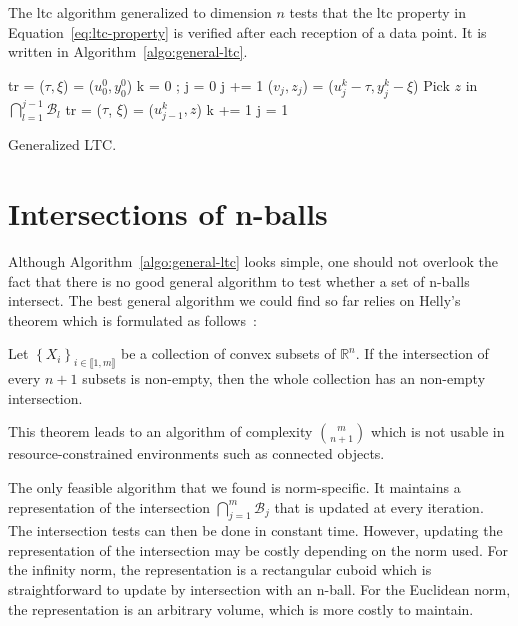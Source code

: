 The \acrshort{ltc} algorithm generalized to dimension $n$ tests that the
\acrshort{ltc} property in Equation~\ref{eq:ltc-property} is verified after each
reception of a data point. It is written in Algorithm~\ref{algo:general-ltc}.
\begin{algorithm}
\begin{algorithmic}[1]
\Input
\EndInput
\Output
\EndOutput

\State tr = ($\tau, \xi$) = ($u^0_0, y^0_0$) 
\State k = 0 ; j = 0
    \State j += 1
    \State ($v_j, z_j$) = ($u_j^k - \tau, y_j^k - \xi$)
        \State Pick $z$ in $\bigcap_{l=1}^{j-1}{\mathcal{B}_l}$ 
        \State tr = ($\tau$, $\xi$) = ($u^k_{j-1}, z$)
        \State k += 1
        \State j = 1
    \EndIf
\EndWhile
\end{algorithmic}
\caption{Generalized LTC.}
\label{algo:general-ltc}
\end{algorithm}

\section{Intersections of n-balls}

Although Algorithm~\ref{algo:general-ltc} looks simple, one should not overlook
the fact that there is no good general algorithm to test whether a set of
n-balls intersect. The best general algorithm we could find so far relies on
Helly's theorem which is formulated as follows~\cite{helly1923mengen}:
\begin{theorem}
Let $\left\{ X_i \right\}_{i \in \llbracket 1, m \rrbracket}$ be a collection of
convex subsets of $\mathbb{R}^n$. If the intersection of every $n+1$ subsets is
non-empty, then the whole collection has an non-empty intersection.
\end{theorem}
\noindent This theorem leads to an algorithm of complexity ${\binom{m}{n+1}}$
which is not usable in resource-constrained environments such as connected
objects.

The only feasible algorithm that we found is norm-specific. It
maintains a representation of the intersection
$\bigcap_{j=1}^{m}{\mathcal{B}_j}$ that is updated at every iteration.
The intersection tests can then be done in constant time. However,
updating the representation of the intersection may be costly
depending on the norm used. For the infinity norm, the representation
is a rectangular cuboid which is straightforward to update by
intersection with an n-ball.
For the Euclidean norm, the representation is an arbitrary volume,
which is more costly to maintain.

